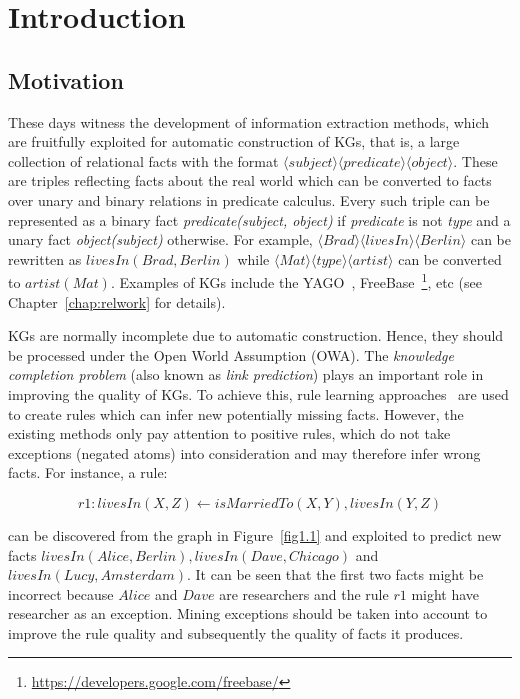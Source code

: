 \chapter{Introduction}
\label{chap:intro}

\section{Motivation}
\label{chap:motivation}

These days witness the development of information extraction methods, which are fruitfully exploited for automatic construction of KGs, that is, a large collection of relational facts with the format $\langle subject \rangle \langle predicate \rangle \langle object \rangle$. These are triples reflecting facts about the real world which can be converted to facts over unary and binary relations in predicate calculus. Every such triple can be represented as a binary fact \textit{predicate(subject, object)} if \textit{predicate} is not \textit{type} and a unary fact \textit{object(subject)} otherwise. For example, $\langle Brad \rangle \langle livesIn \rangle \langle Berlin \rangle$ can be rewritten as $livesIn(Brad, Berlin)$ while $\langle Mat \rangle \langle type \rangle \langle artist \rangle$ can be converted to $artist(Mat)$. Examples of KGs include the YAGO~\cite{ref28}, FreeBase~\footnote{\url{https://developers.google.com/freebase/}}, etc (see Chapter~\ref{chap:relwork} for details).

KGs are normally incomplete due to automatic construction. Hence, they should be processed under the Open World Assumption (OWA). The \textit{knowledge completion problem} (also known as \textit{link prediction}) plays an important role in improving the quality of KGs. To achieve this, rule learning approaches~\cite{ref39, ref10} are used to create rules which can infer new potentially missing facts. However, the existing methods only pay attention to positive rules, which do not take exceptions (negated atoms) into consideration and may therefore infer wrong facts. For instance, a rule:

\begin{equation}
r1: livesIn(X,Z) \leftarrow isMarriedTo(X,Y), livesIn(Y,Z)
\end{equation}
\label{rule1}

can be discovered from the graph in Figure~\ref{fig1.1} and exploited to predict new facts $livesIn(Alice, Berlin), livesIn(Dave, Chicago)$ and $livesIn(Lucy, Amsterdam)$. It can be seen that the first two facts might be incorrect because $Alice$ and $Dave$ are researchers and the rule $r1$ might have researcher as an exception. Mining exceptions should be taken into account to improve the rule quality and subsequently the quality of facts it produces.

